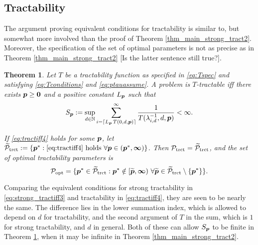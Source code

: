 \documentclass[sort&compress]{elsarticle}
\newcommand{\peter}[1]{\begingroup\color{violet}#1\endgroup}
\newtheorem{theorem}{Theorem}
\begin{document}
\subsection{Tractability} \label{sec:tractability}


The argument proving equivalent conditions for tractability is similar to, but somewhat more involved than the proof of Theorem \ref{thm_main_strong_tract2}.  Moreover, the specification of the set of optimal parameters is not as precise as in Theorem \ref{thm_main_strong_tract2} \peter{[Is the latter sentence still true?]}.

\begin{theorem}\label{thm_main_tract2}
Let $T$ be a tractability function as specified in \eqref{eq:Tspec} and satisfying \eqref{eq:Tconditions} and \eqref{eq:ptauassume}.  A problem is $T$-tractable iff there exists $\boldsymbol{p}\ge \boldsymbol{0}$ and a positive constant $L_{\boldsymbol{p}}$ such that
\begin{equation} \label{eq:tractiff4}
     S_{\boldsymbol{p}}:=\sup_{d \in \mathbb{N}}
     \sum_{i = \lceil L_{\boldsymbol{p}}\, T(0,d,\boldsymbol{p}) \rceil}^\infty \frac{1}{T(\lambda^{-1}_{i,d},d,\boldsymbol{p})}< \infty.
\end{equation}

If \eqref{eq:tractiff4} holds for some $\boldsymbol{p}$, let $\widetilde{\mathcal{P}}_{\textup{trct}} : = \{\boldsymbol{p}^* : \eqref{eq:tractiff4} \text{ holds }\forall \boldsymbol{p} \in (\boldsymbol{p}^*,\boldsymbol{\infty}) \}$.
Then $\mathcal{P}_{\textup{trct}} = \widetilde{\mathcal{P}}_{\textup{trct}}$, and the set of optimal  tractability parameters is
\[
\mathcal{P}_{\textup{opt}} =
\{\boldsymbol{p}^* \in \widetilde{\mathcal{P}}_{\textup{trct}} :  \boldsymbol{p}^* \notin [\widetilde{\boldsymbol{p}},\boldsymbol{\infty}) \ \forall \widetilde{\boldsymbol{p}}\in  \widetilde{\mathcal{P}}_{\textup{trct}} \setminus \{\boldsymbol{p}^*\} \}.
\]

\end{theorem}

Comparing the equivalent conditions for strong tractability in \eqref{eq:strong_tractiff3} and tractability in \eqref{eq:tractiff4}, they are seen to be nearly the same.  The difference lies in the lower summation index, which is allowed to depend on $d$ for tractability, and the second argument of $T$ in the sum, which is $1$ for strong tractability, and $d$ in general.  Both of these can allow $S_{\boldsymbol{p}}$ to be finite in Theorem \ref{thm_main_tract2}, when it may be infinite in Theorem \ref{thm_main_strong_tract2}.
\end{document}
